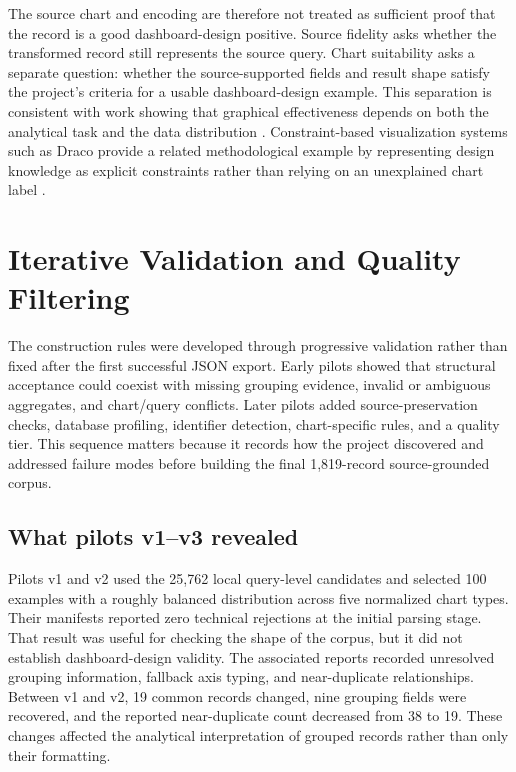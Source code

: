 The source chart and encoding are therefore not treated as sufficient proof that the record is a good dashboard-design positive. Source fidelity asks whether the transformed record still represents the source query. Chart suitability asks a separate question: whether the source-supported fields and result shape satisfy the project's criteria for a usable dashboard-design example. This separation is consistent with work showing that graphical effectiveness depends on both the analytical task and the data distribution \cite{saket2019taskbased,kim2018taskdata}. Constraint-based visualization systems such as Draco provide a related methodological example by representing design knowledge as explicit constraints rather than relying on an unexplained chart label \cite{moritz2019draco}.

\section{Iterative Validation and Quality Filtering}

The construction rules were developed through progressive validation rather than fixed after the first successful JSON export. Early pilots showed that structural acceptance could coexist with missing grouping evidence, invalid or ambiguous aggregates, and chart/query conflicts. Later pilots added source-preservation checks, database profiling, identifier detection, chart-specific rules, and a quality tier. This sequence matters because it records how the project discovered and addressed failure modes before building the final 1,819-record source-grounded corpus.

\subsection{What pilots v1--v3 revealed}

Pilots v1 and v2 used the 25,762 local query-level candidates and selected 100 examples with a roughly balanced distribution across five normalized chart types. Their manifests reported zero technical rejections at the initial parsing stage. That result was useful for checking the shape of the corpus, but it did not establish dashboard-design validity. The associated reports recorded unresolved grouping information, fallback axis typing, and near-duplicate relationships. Between v1 and v2, 19 common records changed, nine grouping fields were recovered, and the reported near-duplicate count decreased from 38 to 19. These changes affected the analytical interpretation of grouped records rather than only their formatting.


